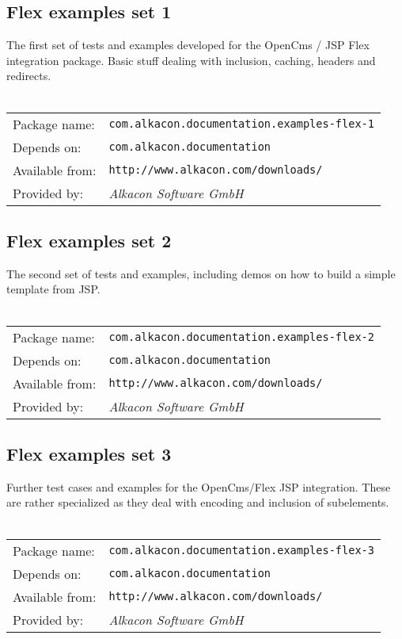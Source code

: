 \subsection{Flex examples set 1}
The first set of tests and examples developed for the OpenCms / JSP Flex integration package. 
Basic stuff dealing with inclusion, caching, headers and redirects.
\\
\\
\begin{tabular}{ll}
Package name: & {\tt com.alkacon.documentation.examples-flex-1}\\
Depends on: & {\tt com.alkacon.documentation}\\
Available from: & {\tt http://www.alkacon.com/downloads/}\\
Provided by: & {\em Alkacon Software GmbH}\\
\end{tabular}

\subsection{Flex examples set 2}
The second set of tests and examples, including demos on how to build a simple template from JSP.
\\
\\
\begin{tabular}{ll}
Package name: & {\tt com.alkacon.documentation.examples-flex-2}\\
Depends on: & {\tt com.alkacon.documentation}\\
Available from: & {\tt http://www.alkacon.com/downloads/}\\
Provided by: & {\em Alkacon Software GmbH}\\
\end{tabular}

\subsection{Flex examples set 3}
Further test cases and examples for the OpenCms/Flex JSP integration. These are rather 
specialized as they deal with encoding and inclusion of subelements.
\\
\\
\begin{tabular}{ll}
Package name: & {\tt com.alkacon.documentation.examples-flex-3}\\
Depends on: & {\tt com.alkacon.documentation}\\
Available from: & {\tt http://www.alkacon.com/downloads/}\\
Provided by: & {\em Alkacon Software GmbH}\\
\end{tabular}

